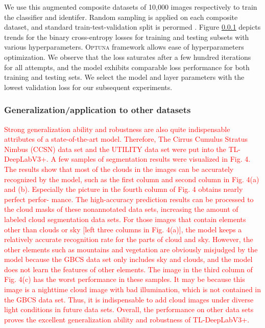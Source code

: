 \documentclass[amt, article]{copernicus}
\begin{document}
We use this augmented composite datasets of 10,000 images respectively to train the classifier and identifer. Random sampling is applied on each composite dataset, and standard train-test-validation split is perormed . Figure \ref{} depicts trends for the binary cross-entropy losses for training and testing subsets with various hyperparameters. \textsc{Optuna} framework allows ease of hyperparameters optimization. We observe that the loss saturates after a few hundred iterations for all attempts, and the model exhibits comparable loss performance for both training and testing sets. We select the model and layer parameters with the lowest validation loss for our subsequent experiments.

\subsubsection{Generalization/application to other datasets}

\textcolor{red}{Strong generalization ability and robustness are also quite
indispensable attributes of a state-of-the-art model. Therefore,
The Cirrus Cumulus Stratus Nimbus (CCSN) data set and the
UTILITY data set were put into the TL-DeepLabV3+. A few
samples of segmentation results were visualized in Fig. 4. The
results show that most of the clouds in the images can be
accurately recognized by the model, such as the first column
and second column in Fig. 4(a) and (b). Especially the picture
in the fourth column of Fig. 4 obtains nearly perfect perfor-
mance. The high-accuracy prediction results can be processed
to the cloud masks of these nonannotated data sets, increasing
the amount of labeled cloud segmentation data sets. For those
images that contain elements other than clouds or sky [left
three columns in Fig. 4(a)], the model keeps a relatively
accurate recognition rate for the parts of cloud and sky.
However, the other elements such as mountains and vegetation
are obviously misjudged by the model because the GBCS data
set only includes sky and clouds, and the model does not learn
the features of other elements. The image in the third column
of Fig. 4(c) has the worst performance in these samples. It may
be because this image is a nighttime cloud image with bad
illumination, which is not contained in the GBCS data set.
Thus, it is indispensable to add cloud images under diverse
light conditions in future data sets. Overall, the performance
on other data sets proves the excellent generalization ability
and robustness of TL-DeepLabV3+.}
\end{document}
